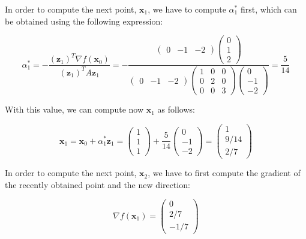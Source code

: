 \documentclass[11pt,a4paper]{article}
\begin{document}
In order to compute the next point, $\mathbf{x}_1$, we have to compute $\alpha_1^*$ first,
which can be obtained using the following expression:

\[
  \alpha_1^* = - \frac{(\mathbf{z}_1)^T \nabla f(\mathbf{x}_0)}{(\mathbf{z}_1)^T A \mathbf{z}_1} =
  -
  \frac{
    \begin{pmatrix}
      0 & -1 & -2
    \end{pmatrix}
    \begin{pmatrix}
      0 \\
      1 \\
      2
    \end{pmatrix}
  }
  {
    \begin{pmatrix}
      0 & -1 & -2
    \end{pmatrix}
    \begin{pmatrix}
      1 & 0 & 0 \\
      0 & 2 & 0 \\
      0 & 0 & 3
    \end{pmatrix}
    \begin{pmatrix}
      0 \\
      -1 \\
      -2
    \end{pmatrix}
  }
  =
  \frac{5}{14}
\]

With this value, we can compute now $\mathbf{x}_1$ as follows:

\[
  \mathbf{x}_1 = \mathbf{x}_0 + \alpha_1^*\mathbf{z}_1 =
  \begin{pmatrix}
    1 \\
    1 \\
    1
  \end{pmatrix}
  + \frac{5}{14}
  \begin{pmatrix}
    0 \\
    -1 \\
    -2
  \end{pmatrix}
  =
  \begin{pmatrix}
    1 \\
    9 / 14 \\
    2 / 7
  \end{pmatrix}
\]

In order to compute the next point, $\mathbf{x}_2$, we have to first compute the gradient
of the recently obtained point and the new direction:

\[
  \nabla f(\mathbf{x}_1) =
  \begin{pmatrix}
    0 \\
    2 / 7 \\
    -1 / 7
  \end{pmatrix}
\]
\end{document}
